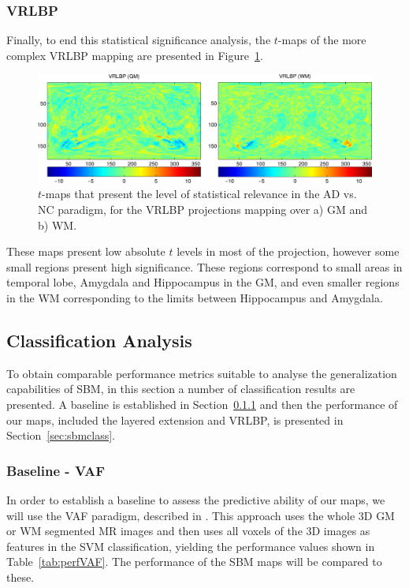 \subsubsection{VRLBP}\label{sec:vrlbpttest}
Finally, to end this statistical significance analysis, the $t$-maps of the more complex VRLBP mapping are presented in Figure~\ref{fig:tmapvrlbp}.

\begin{figure}[htp]
	\centering
	\includegraphics[width=\textwidth]{gfx/ch6/09-tmaps_vrlbp}
	\caption{$t$-maps that present the level of statistical relevance in the AD vs. NC paradigm, for the VRLBP projections mapping over a) \ac{GM} and b) \ac{WM}. }
	\label{fig:tmapvrlbp}
\end{figure}

These maps present low absolute $t$ levels in most of the projection, however some small regions present high significance. These regions correspond to small areas in temporal lobe, Amygdala and Hippocampus in the \ac{GM}, and even smaller regions in the \ac{WM} corresponding to the limits between Hippocampus and Amygdala. 

\subsection{Classification Analysis}\label{sec:classification}
To obtain comparable performance metrics suitable to analyse the generalization capabilities of \ac{SBM}, in this section a number of classification results are presented. A baseline is established in Section~\ref{sec:baseline} and then the performance of our maps, included the layered extension and VRLBP, is presented in Section~\ref{sec:sbmclass}.

\subsubsection{Baseline - VAF}\label{sec:baseline}
In order to establish a baseline to assess the predictive ability of our maps, we will use the \acf{VAF} paradigm, described in \cite{Stoeckel04}. This approach uses the whole 3D \ac{GM} or \ac{WM} segmented MR images and then uses all voxels of the 3D images as features in the SVM classification, yielding the performance values shown in Table~\ref{tab:perfVAF}. The performance of the \ac{SBM} maps will be compared to these. 

